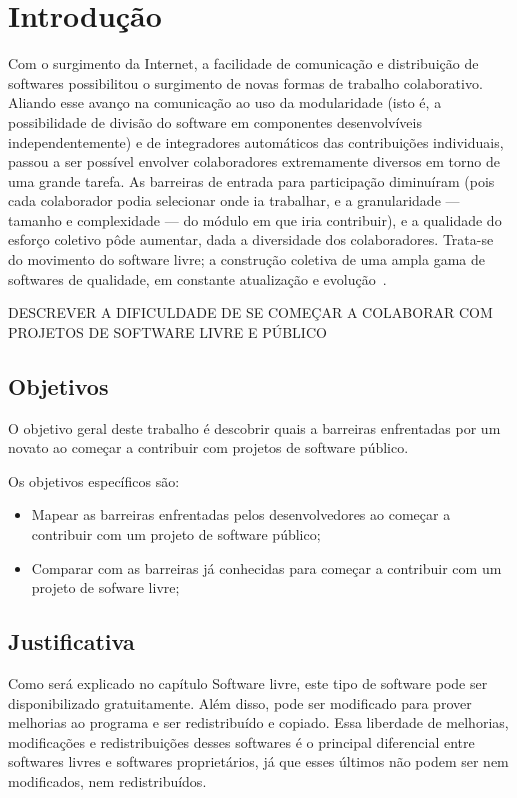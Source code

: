 \chapter{Introdução}




Com o surgimento da Internet, a facilidade de comunicação e distribuição de 
softwares possibilitou o surgimento de novas formas de trabalho colaborativo.
Aliando esse avanço na comunicação ao uso da modularidade (isto é, a possibilidade 
de divisão do software em componentes desenvolvíveis independentemente) e de 
integradores automáticos das contribuições individuais, passou a ser possível 
envolver colaboradores extremamente diversos em torno de uma grande tarefa. 
As barreiras de entrada para participação diminuíram (pois cada colaborador podia 
selecionar onde ia trabalhar, e a granularidade — tamanho e complexidade — do módulo 
em que iria contribuir), e a qualidade do esforço coletivo pôde aumentar, dada a 
diversidade dos colaboradores. Trata-se do movimento do software livre; 
a construção coletiva de uma ampla gama de softwares de qualidade, em constante 
atualização e evolução~\cite{simon2010rossio}.

DESCREVER A DIFICULDADE DE SE COMEÇAR A COLABORAR COM PROJETOS DE SOFTWARE LIVRE E PÚBLICO

\section{Objetivos}

O objetivo geral deste trabalho é descobrir quais a barreiras enfrentadas por um novato ao 
começar a contribuir com projetos de software público.

Os objetivos específicos são:

\begin{itemize}
\item Mapear as barreiras enfrentadas pelos desenvolvedores ao começar a contribuir
com um projeto de software público;
\item Comparar com as barreiras já conhecidas para começar a contribuir com um projeto 
de sofware livre;
\end{itemize}

\section{Justificativa}


Como será explicado no capítulo Software livre, este tipo de software pode ser disponibilizado
gratuitamente. Além disso, pode ser modificado para prover melhorias ao
programa e ser redistribuído e copiado. Essa liberdade de melhorias, modificações e redistribuições
desses softwares é o principal diferencial entre softwares livres e softwares proprietários, já que
esses últimos não podem ser nem modificados, nem redistribuídos.

